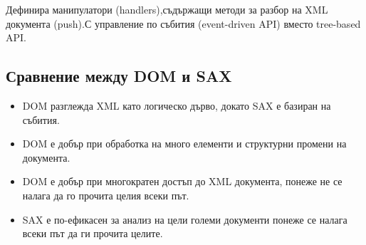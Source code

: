 \documentclass[fleqn,12pt]{article}
\begin{document}
Дефинира манипулатори (handlers),съдържащи методи за разбор на XML документа (push).С управление по събития (event-driven API) вместо tree-based API.

\subsection{Сравнение между DOM и SAX}

\begin{itemize}
    \item DOM разглежда XML като логическо дърво, докато SAX е базиран на събития.
    \item DOM е добър при обработка на много елементи и структурни промени на документа.
    \item DOM е добър при многократен достъп до XML документа, понеже не се налага да го прочита целия всеки път.
    \item SAX е по-ефикасен за анализ на цели големи документи понеже се налага всеки път да ги прочита целите.
\end{itemize}
\end{document}
